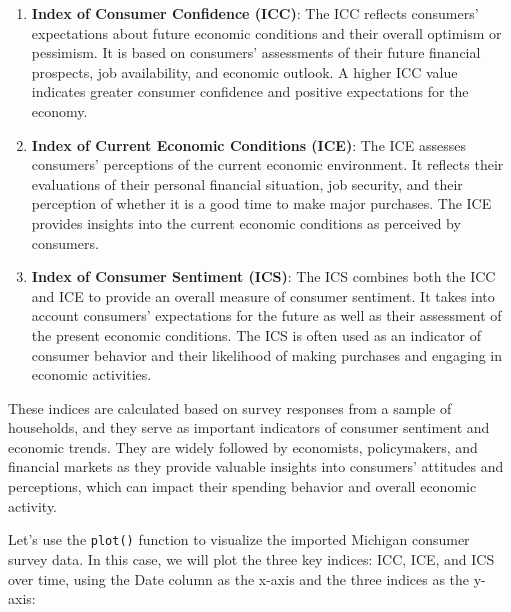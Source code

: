 \documentclass[
]{book}
\begin{document}
\begin{enumerate}
\def\labelenumi{\arabic{enumi}.}
\item
  \textbf{Index of Consumer Confidence (ICC)}: The ICC reflects consumers' expectations about future economic conditions and their overall optimism or pessimism. It is based on consumers' assessments of their future financial prospects, job availability, and economic outlook. A higher ICC value indicates greater consumer confidence and positive expectations for the economy.
\item
  \textbf{Index of Current Economic Conditions (ICE)}: The ICE assesses consumers' perceptions of the current economic environment. It reflects their evaluations of their personal financial situation, job security, and their perception of whether it is a good time to make major purchases. The ICE provides insights into the current economic conditions as perceived by consumers.
\item
  \textbf{Index of Consumer Sentiment (ICS)}: The ICS combines both the ICC and ICE to provide an overall measure of consumer sentiment. It takes into account consumers' expectations for the future as well as their assessment of the present economic conditions. The ICS is often used as an indicator of consumer behavior and their likelihood of making purchases and engaging in economic activities.
\end{enumerate}

These indices are calculated based on survey responses from a sample of households, and they serve as important indicators of consumer sentiment and economic trends. They are widely followed by economists, policymakers, and financial markets as they provide valuable insights into consumers' attitudes and perceptions, which can impact their spending behavior and overall economic activity.

Let's use the \texttt{plot()} function to visualize the imported Michigan consumer survey data. In this case, we will plot the three key indices: ICC, ICE, and ICS over time, using the Date column as the x-axis and the three indices as the y-axis:
\end{document}
